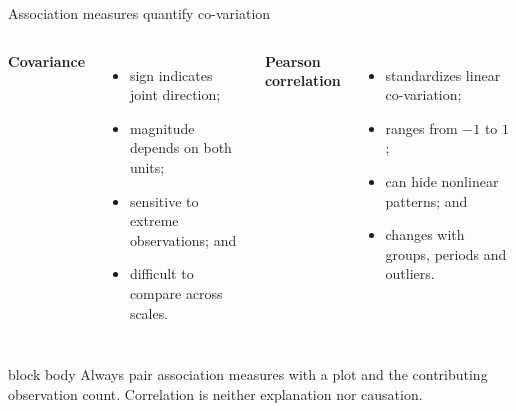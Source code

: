 \documentclass[10pt,aspectratio=169]{beamer}
\begin{document}
\begin{frame}{Association measures quantify co-variation}

\small

\begin{columns}[T]


\textbf{Covariance}

\begin{itemize}
  \item sign indicates joint direction;
  \item magnitude depends on both units;
  \item sensitive to extreme observations; and
  \item difficult to compare across scales.
\end{itemize}


\textbf{Pearson correlation}

\begin{itemize}
  \item standardizes linear co-variation;
  \item ranges from $-1$ to $1$;
  \item can hide nonlinear patterns; and
  \item changes with groups, periods and outliers.
\end{itemize}

\end{columns}

\vspace{0.35cm}

\begin{beamercolorbox}[rounded=true,sep=8pt]{block body}
Always pair association measures with a plot and the contributing observation count. Correlation is neither explanation nor causation.
\end{beamercolorbox}

\end{frame}
\end{document}
